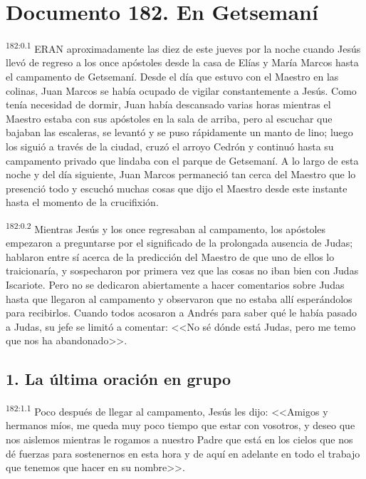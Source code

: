 \chapter{Documento 182. En Getsemaní}
\par 
\textsuperscript{182:0.1} ERAN aproximadamente las diez de este jueves por la noche cuando Jesús llevó de regreso a los once apóstoles desde la casa de Elías y María Marcos hasta el campamento de Getsemaní. Desde el día que estuvo con el Maestro en las colinas, Juan Marcos se había ocupado de vigilar constantemente a Jesús. Como tenía necesidad de dormir, Juan había descansado varias horas mientras el Maestro estaba con sus apóstoles en la sala de arriba, pero al escuchar que bajaban las escaleras, se levantó y se puso rápidamente un manto de lino; luego los siguió a través de la ciudad, cruzó el arroyo Cedrón y continuó hasta su campamento privado que lindaba con el parque de Getsemaní. A lo largo de esta noche y del día siguiente, Juan Marcos permaneció tan cerca del Maestro que lo presenció todo y escuchó muchas cosas que dijo el Maestro desde este instante hasta el momento de la crucifixión.

\par 
\textsuperscript{182:0.2} Mientras Jesús y los once regresaban al campamento, los apóstoles empezaron a preguntarse por el significado de la prolongada ausencia de Judas; hablaron entre sí acerca de la predicción del Maestro de que uno de ellos lo traicionaría, y sospecharon por primera vez que las cosas no iban bien con Judas Iscariote. Pero no se dedicaron abiertamente a hacer comentarios sobre Judas hasta que llegaron al campamento y observaron que no estaba allí esperándolos para recibirlos. Cuando todos acosaron a Andrés para saber qué le había pasado a Judas, su jefe se limitó a comentar: <<No sé dónde está Judas, pero me temo que nos ha abandonado>>.

\section*{1. La última oración en grupo}
\par 
\textsuperscript{182:1.1} Poco después de llegar al campamento, Jesús les dijo: <<Amigos y hermanos míos, me queda muy poco tiempo que estar con vosotros, y deseo que nos aislemos mientras le rogamos a nuestro Padre que está en los cielos que nos dé fuerzas para sostenernos en esta hora y de aquí en adelante en todo el trabajo que tenemos que hacer en su nombre>>.

